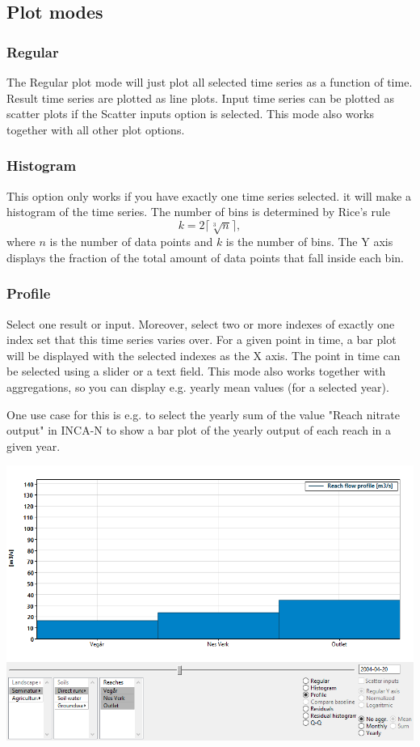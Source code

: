\documentclass[11pt]{article}
\theoremstyle{definition}
\begin{document}
\subsection{Plot modes}

\subsubsection{Regular}

The Regular plot mode will just plot all selected time series as a function of time. Result time series are plotted as line plots. Input time series can be plotted as scatter plots if the Scatter inputs option is selected. This mode also works together with all other plot options.

\subsubsection{Histogram}

This option only works if you have exactly one time series selected. it will make a histogram of the time series. The number of bins is determined by %
Rice's rule %
\[
k = 2\lceil\sqrt[3]{n}\rceil,
\]
where $n$ is the number of data points and $k$ is the number of bins. The Y axis displays the fraction of the total amount of data points that fall inside each bin.

\subsubsection{Profile}

Select one result or input. Moreover, select two or more indexes of exactly one index set that this time series varies over. For a given point in time, a bar plot will be displayed with the selected indexes as the X axis. The point in time can be selected using a slider or a text field. This mode also works together with aggregations, so you can display e.g. yearly mean values (for a selected year).

One use case for this is e.g. to select the yearly sum of the value "Reach nitrate output" in INCA-N to show a bar plot of the yearly output of each reach in a given year.

\begin{center}
\includegraphics[width=0.7\linewidth]{img/scr2}
\end{center}
\end{document}
